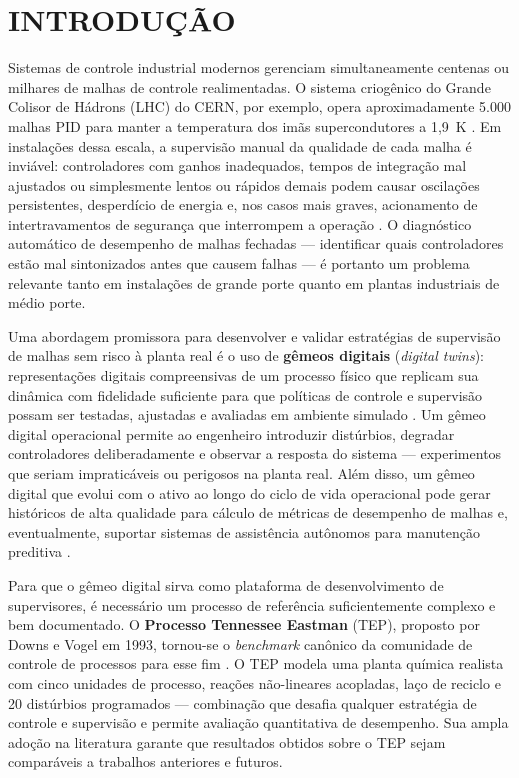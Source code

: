 \chapter[INTRODUÇÃO]{INTRODUÇÃO}

Sistemas de controle industrial modernos gerenciam simultaneamente centenas ou milhares de malhas de controle realimentadas. O sistema criogênico do Grande Colisor de Hádrons (LHC) do CERN, por exemplo, opera aproximadamente 5.000 malhas PID para manter a temperatura dos imãs supercondutores a 1,9~K \cite{CERN_WEAPL02}. Em instalações dessa escala, a supervisão manual da qualidade de cada malha é inviável: controladores com ganhos inadequados, tempos de integração mal ajustados ou simplesmente lentos ou rápidos demais podem causar oscilações persistentes, desperdício de energia e, nos casos mais graves, acionamento de intertravamentos de segurança que interrompem a operação \cite{CERN_WEAPL02}. O diagnóstico automático de desempenho de malhas fechadas — identificar quais controladores estão mal sintonizados antes que causem falhas — é portanto um problema relevante tanto em instalações de grande porte quanto em plantas industriais de médio porte.

Uma abordagem promissora para desenvolver e validar estratégias de supervisão de malhas sem risco à planta real é o uso de \textbf{gêmeos digitais} (\textit{digital twins}): representações digitais compreensivas de um processo físico que replicam sua dinâmica com fidelidade suficiente para que políticas de controle e supervisão possam ser testadas, ajustadas e avaliadas em ambiente simulado \cite{Boschert2016}. Um gêmeo digital operacional permite ao engenheiro introduzir distúrbios, degradar controladores deliberadamente e observar a resposta do sistema — experimentos que seriam impraticáveis ou perigosos na planta real. Além disso, um gêmeo digital que evolui com o ativo ao longo do ciclo de vida operacional pode gerar históricos de alta qualidade para cálculo de métricas de desempenho de malhas e, eventualmente, suportar sistemas de assistência autônomos para manutenção preditiva \cite{Boschert2016}.

Para que o gêmeo digital sirva como plataforma de desenvolvimento de supervisores, é necessário um processo de referência suficientemente complexo e bem documentado. O \textbf{Processo Tennessee Eastman} (TEP), proposto por Downs e Vogel em 1993, tornou-se o \textit{benchmark} canônico da comunidade de controle de processos para esse fim \cite{DOWNS1993}. O TEP modela uma planta química realista com cinco unidades de processo, reações não-lineares acopladas, laço de reciclo e 20 distúrbios programados — combinação que desafia qualquer estratégia de controle e supervisão e permite avaliação quantitativa de desempenho. Sua ampla adoção na literatura garante que resultados obtidos sobre o TEP sejam comparáveis a trabalhos anteriores e futuros.

